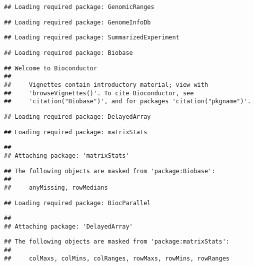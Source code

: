 \documentclass[]{article}
\begin{document}
\begin{verbatim}
## Loading required package: GenomicRanges
\end{verbatim}

\begin{verbatim}
## Loading required package: GenomeInfoDb
\end{verbatim}

\begin{verbatim}
## Loading required package: SummarizedExperiment
\end{verbatim}

\begin{verbatim}
## Loading required package: Biobase
\end{verbatim}

\begin{verbatim}
## Welcome to Bioconductor
## 
##     Vignettes contain introductory material; view with
##     'browseVignettes()'. To cite Bioconductor, see
##     'citation("Biobase")', and for packages 'citation("pkgname")'.
\end{verbatim}

\begin{verbatim}
## Loading required package: DelayedArray
\end{verbatim}

\begin{verbatim}
## Loading required package: matrixStats
\end{verbatim}

\begin{verbatim}
## 
## Attaching package: 'matrixStats'
\end{verbatim}

\begin{verbatim}
## The following objects are masked from 'package:Biobase':
## 
##     anyMissing, rowMedians
\end{verbatim}

\begin{verbatim}
## Loading required package: BiocParallel
\end{verbatim}

\begin{verbatim}
## 
## Attaching package: 'DelayedArray'
\end{verbatim}

\begin{verbatim}
## The following objects are masked from 'package:matrixStats':
## 
##     colMaxs, colMins, colRanges, rowMaxs, rowMins, rowRanges
\end{verbatim}
\end{document}
